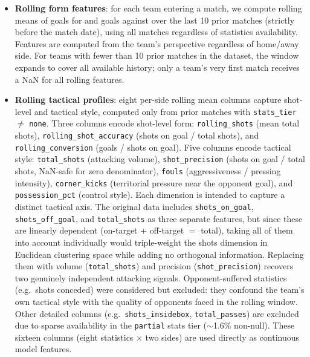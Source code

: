 \documentclass[conference]{IEEEtran}
\begin{document}
\begin{itemize}
  \item \textbf{Rolling form features}: for each team entering a match, we compute
  rolling means of goals for and goals against over the last 10 prior matches (strictly
  before the match date), using all matches regardless of statistics availability.
  Features are computed from the team's perspective regardless of home/away side.
  For teams with fewer than 10 prior matches in the dataset, the window expands to cover
  all available history; only a team's very first match receives a NaN for all rolling
  features.

  \item \textbf{Rolling tactical profiles}: eight per-side rolling mean columns
  capture shot-level and tactical style, computed only from prior matches with
  \texttt{stats\_tier} $\neq$ \texttt{none}.
  Three columns encode shot-level form: \texttt{rolling\_shots} (mean total shots),
  \texttt{rolling\_shot\_accuracy} (shots on goal / total shots), and
  \texttt{rolling\_conversion} (goals / shots on goal).
  Five columns encode tactical style: \texttt{total\_shots} (attacking volume),
  \texttt{shot\_precision} (shots on goal / total shots, NaN-safe for zero denominator),
  \texttt{fouls} (aggressiveness / pressing intensity),
  \texttt{corner\_kicks} (territorial pressure near the opponent goal),
  and \texttt{possession\_pct} (control style).
  Each dimension is intended to capture a distinct tactical axis.
  The original data includes \texttt{shots\_on\_goal}, \texttt{shots\_off\_goal},
  and \texttt{total\_shots} as three separate features, but since these are linearly
  dependent (on-target + off-target $=$ total), taking all of them into account
  individually would triple-weight the shots dimension in Euclidean clustering space
  while adding no orthogonal information. Replacing them with volume
  (\texttt{total\_shots}) and precision (\texttt{shot\_precision}) recovers two
  genuinely independent attacking signals.
  Opponent-suffered statistics (e.g.\ shots conceded) were considered but excluded:
  they confound the team's own tactical style with the quality of opponents faced in
  the rolling window.
  Other detailed columns (e.g.\ \texttt{shots\_insidebox}, \texttt{total\_passes}) are
  excluded due to sparse availability in the \texttt{partial} stats tier
  ($\sim$1.6\% non-null).
  These sixteen columns (eight statistics $\times$ two sides) are used directly as
  continuous model features.


\end{itemize}
\end{document}
